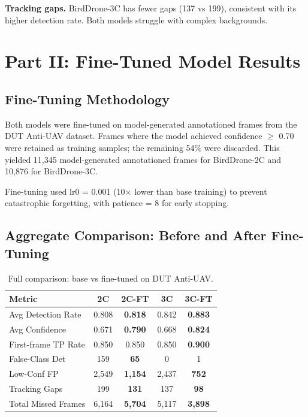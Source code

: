 \documentclass[11pt]{article}
\begin{document}
\textbf{Tracking gaps.}
BirdDrone-3C has fewer gaps (137 vs 199), consistent with its higher
detection rate. Both models struggle with complex backgrounds.

\section{Part II: Fine-Tuned Model Results}

\subsection{Fine-Tuning Methodology}

Both models were fine-tuned on model-generated annotationed frames from the DUT Anti-UAV
dataset. Frames where the model achieved confidence $\geq$ 0.70 were retained
as training samples; the remaining 54\% were discarded. This yielded 11,345
model-generated annotationed frames for BirdDrone-2C and 10,876 for BirdDrone-3C.

Fine-tuning used lr0 = 0.001 (10$\times$ lower than base training) to prevent
catastrophic forgetting, with patience = 8 for early stopping.

\subsection{Aggregate Comparison: Before and After Fine-Tuning}

\begin{table}[H]
\centering
\caption{Full comparison: base vs fine-tuned on DUT Anti-UAV.}
\label{tab:ft_compare}
\begin{tabular}{lcccc}
\toprule
\textbf{Metric} & \textbf{2C} & \textbf{2C-FT} & \textbf{3C} & \textbf{3C-FT} \\
\midrule
Avg Detection Rate    & 0.808 & \textbf{0.818} & 0.842 & \textbf{0.883} \\
Avg Confidence        & 0.671 & \textbf{0.790} & 0.668 & \textbf{0.824} \\
First-frame TP Rate   & 0.850 & 0.850          & 0.850 & \textbf{0.900} \\
False-Class Det       & 159   & \textbf{65}    & 0     & 1 \\
Low-Conf FP           & 2,549 & \textbf{1,154} & 2,437 & \textbf{752} \\
Tracking Gaps         & 199   & \textbf{131}   & 137   & \textbf{98} \\
Total Missed Frames   & 6,164 & \textbf{5,704} & 5,117 & \textbf{3,898} \\
\bottomrule
\end{tabular}
\end{table}
\end{document}
